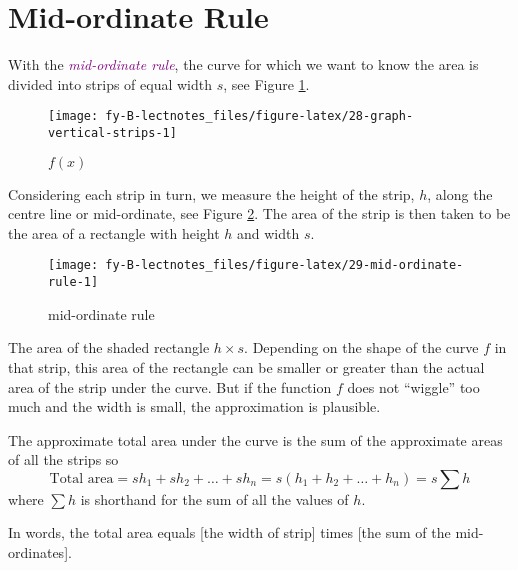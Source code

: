 \documentclass[
  english,
  11pt,
  oneside]{book}
\newcommand{\slide}{}
\theoremstyle{definition}
\theoremstyle{definition}
\theoremstyle{definition}
\theoremstyle{definition}
\theoremstyle{remark}
\begin{document}
\slide

\section{Mid-ordinate Rule}\label{mid-ordinate-rule}

With the \textcolor{purple}{\em mid-ordinate rule}, the curve for which we want to know the area is divided into strips of equal width \(s\), see Figure \ref{fig:28-graph-vertical-strips}.

\begin{figure}

{\centering \texttt{[image: fy-B-lectnotes\_files/figure-latex/28-graph-vertical-strips-1]} 

}

\caption{$f(x)$}\label{fig:28-graph-vertical-strips}
\end{figure}
\slide

Considering each strip in turn, we measure the height of the strip, \(h\), along the centre line or mid-ordinate, see Figure \ref{fig:29-mid-ordinate-rule}. The area of the strip is then taken to be the area of a rectangle with height \(h\) and width \(s\).

\begin{figure}

{\centering \texttt{[image: fy-B-lectnotes\_files/figure-latex/29-mid-ordinate-rule-1]} 

}

\caption{mid-ordinate rule}\label{fig:29-mid-ordinate-rule}
\end{figure}

\slide

The area of the shaded rectangle \(h \times s\). Depending on the shape of the curve \(f\) in that strip, this area of the rectangle can be smaller or greater than the actual area of the strip under the curve. But if the function \(f\) does not ``wiggle'' too much and the width is small, the approximation is plausible.

\slide

The approximate total area under the curve is the sum of the approximate areas of all the strips so
\[
\text{Total area} = sh_1 + sh_2 + \ldots + sh_n = s(h_1 + h_2 + \ldots + h_n) = s\sum h
\]
where \(\sum h\) is shorthand for the sum of all the values of \(h\).

In words, the total area equals {[}the width of strip{]} times {[}the sum of the mid-ordinates{]}.
\end{document}
